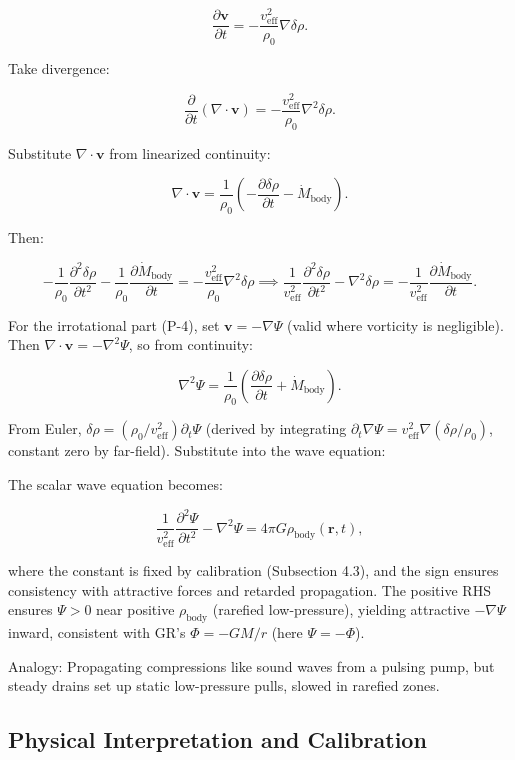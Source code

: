 \documentclass{article}
\begin{document}
\[
\frac{\partial \mathbf{v}}{\partial t} = -\frac{v_{\text{eff}}^2}{\rho_0} \nabla \delta \rho.
\]

Take divergence:

\[
\frac{\partial}{\partial t} (\nabla \cdot \mathbf{v}) = -\frac{v_{\text{eff}}^2}{\rho_0} \nabla^2 \delta \rho.
\]

Substitute $\nabla \cdot \mathbf{v}$ from linearized continuity:

\[
\nabla \cdot \mathbf{v} = \frac{1}{\rho_0} \left( -\frac{\partial \delta \rho}{\partial t} - \dot{M}_{\text{body}} \right).
\]

Then:

\[
-\frac{1}{\rho_0} \frac{\partial^2 \delta \rho}{\partial t^2} - \frac{1}{\rho_0} \frac{\partial \dot{M}_{\text{body}}}{\partial t} = -\frac{v_{\text{eff}}^2}{\rho_0} \nabla^2 \delta \rho \implies \frac{1}{v_{\text{eff}}^2} \frac{\partial^2 \delta \rho}{\partial t^2} - \nabla^2 \delta \rho = -\frac{1}{v_{\text{eff}}^2} \frac{\partial \dot{M}_{\text{body}}}{\partial t}.
\]

For the irrotational part (P-4), set $\mathbf{v} = -\nabla \Psi$ (valid where vorticity is negligible). Then $\nabla \cdot \mathbf{v} = -\nabla^2 \Psi$, so from continuity:

\[
\nabla^2 \Psi = \frac{1}{\rho_0} \left( \frac{\partial \delta \rho}{\partial t} + \dot{M}_{\text{body}} \right).
\]

From Euler, $\delta \rho = (\rho_0 / v_{\text{eff}}^2) \partial_t \Psi$ (derived by integrating $\partial_t \nabla \Psi = v_{\text{eff}}^2 \nabla (\delta \rho / \rho_0)$, constant zero by far-field). Substitute into the wave equation:

The scalar wave equation becomes:

\[
\frac{1}{v_{\text{eff}}^2} \frac{\partial^2 \Psi}{\partial t^2} - \nabla^2 \Psi = 4\pi G \rho_{\text{body}}(\mathbf{r}, t),
\]

where the constant is fixed by calibration (Subsection 4.3), and the sign ensures consistency with attractive forces and retarded propagation. The positive RHS ensures $\Psi > 0$ near positive $\rho_{\text{body}}$ (rarefied low-pressure), yielding attractive $-\nabla \Psi$ inward, consistent with GR's $\Phi = -GM/r$ (here $\Psi = -\Phi$).

Analogy: Propagating compressions like sound waves from a pulsing pump, but steady drains set up static low-pressure pulls, slowed in rarefied zones.

\subsection{Physical Interpretation and Calibration}
\end{document}
